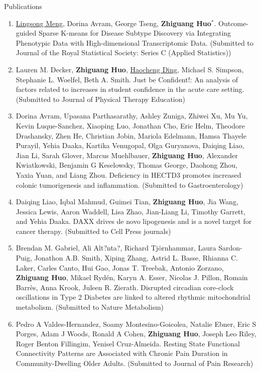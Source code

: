 \documentclass{resume} %
\begin{document}
\begin{rSection}{Publications}
\begin{enumerate}[noitemsep,topsep=0pt]
\item
\underline{Lingsong Meng}, Dorina Avram, George Tseng, {\bf Zhiguang Huo}$^*$.
Outcome-guided Sparse K-means for Disease Subtype Discovery via Integrating Phenotypic Data with High-dimensional Transcriptomic Data.
(Submitted to Journal of the Royal Statistical Society: Series C (Applied Statistics))



\item
Lauren M. Decker, {\bf Zhiguang Huo}, \underline{Haocheng Ding}, Michael S. Simpson, Stephanie L. Woelfel, Beth A. Smith.
Just be Confident!: An analysis of factors related to increases in student confidence in the acute care setting.
(Submitted to Journal of Physical Therapy Education)

\item
Dorina Avram, Upasana Parthasarathy, Ashley Zuniga, Zhiwei Xu, Mu Yu, Kevin Luque-Sanchez, Xiaoping Luo, Jonathan Cho, Eric Helm, Theodore Drashansky, Zhen He, Christian Jobin, Mariola Edelmann, Hamsa Thayele Purayil, Yehia Daaka, Kartika Venugopal, Olga Guryanova, Daiqing Liao, Jian Li, Sarah Glover, Marcus Muehlbauer, {\bf Zhiguang Huo}, Alexander Kwiatkowski, Benjamin G Keselowsky, Thomas George, Daohong Zhou, Yaxia Yuan, and Liang Zhou. 
Deficiency in HECTD3 promotes increased colonic tumorigenesis and inflammation. 
(Submitted to Gastroenterology)

\item  Daiqing Liao, Iqbal Mahmud, Guimei Tian, {\bf Zhiguang Huo}, Jia Wang, Jessica Lewis, Aaron Waddell, Lisa Zhao, Jian-Liang Li, Timothy Garrett, and Yehia Daaka. 
DAXX drives de novo lipogenesis and is a novel target for cancer therapy. 
(Submitted to Cell Press journals)



\item  
Brendan M. Gabriel, Ali Alt?nta?, Richard Tjörnhammar, Laura Sardon-Puig, Jonathon A.B. Smith, Xiping Zhang, Astrid L. Basse, Rhianna C. Laker, Carles Canto, Hui Gao, Jonas T. Treebak, Antonio Zorzano, {\bf Zhiguang Huo}, Mikael Rydén, Karyn A. Esser, Nicolas J. Pillon, Romain Barrès, Anna Krook, Juleen R. Zierath. 
Disrupted circadian core-clock oscillations in Type 2 Diabetes are linked to altered rhythmic mitochondrial metabolism. 
(Submitted to Nature Metabolism)


\item 
Pedro A Valdes-Hernandez, Soamy Montesino-Goicolea, Natalie Ebner, Eric S Porges, Adam J Woods,
Ronald A Cohen, 
{\bf Zhiguang Huo},
Joseph Leo Riley,
Roger Benton Fillingim,
Yenisel Cruz-Almeida.
Resting State Functional Connectivity Patterns are Associated with Chronic Pain Duration in Community-Dwelling Older Adults. 
(Submitted to  Journal of Pain Research)



\end{enumerate}
\end{rSection}
\end{document}
